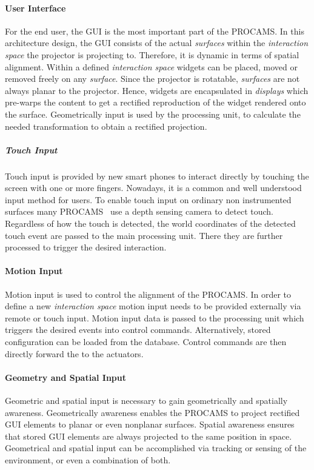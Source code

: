 \paragraph{User Interface}
For the end user, the \acl{GUI} is the most important part of the \ac{PROCAMS}. In this architecture design, the \ac{GUI} consists of the actual \emph{surfaces} within the \emph{interaction space} the projector is projecting to. Therefore, it is dynamic in terms of spatial alignment. Within a defined \emph{interaction space} widgets can be placed, moved or removed freely on any \emph{surface}. Since the projector is rotatable, \emph{surfaces} are not always planar to the projector. Hence, widgets are encapsulated in \emph{displays} which pre-warps the content to get a rectified reproduction of the widget rendered onto the surface. Geometrically input is used by the processing unit, to calculate the needed transformation to obtain a rectified projection.

\subparagraph{Touch Input} 
Touch input is provided by new smart phones to interact directly by touching the screen with one or more fingers. 
Nowadays, it is a common and well understood input method for users. To enable touch input on ordinary non instrumented surfaces many \ac{PROCAMS}~\cite{Hardy:2012jo,Wilson:2012fb,Xiao:2013dp} use a depth sensing camera to detect touch. Regardless of how the touch is detected, the world coordinates of the detected touch event are passed to the main processing unit. There they are further processed to trigger the desired interaction.  

\paragraph{Motion Input}
Motion input is used to control the alignment of the \ac{PROCAMS}. In order to define a new \emph{interaction space} motion input needs to be provided externally via remote or touch input. Motion input data is passed to the processing unit which triggers the desired events into control commands. Alternatively, stored configuration can be loaded from the database. Control commands are then directly forward the to the actuators. 

\paragraph{Geometry and Spatial Input}
Geometric and spatial input is necessary to gain geometrically and spatially awareness. Geometrically awareness enables the \ac{PROCAMS} to project rectified \ac{GUI} elements to planar or even nonplanar surfaces. Spatial awareness ensures that stored \ac{GUI} elements are always projected to the same position in space. Geometrical and spatial input can be accomplished via tracking or sensing of the environment, or even a combination of both. 

